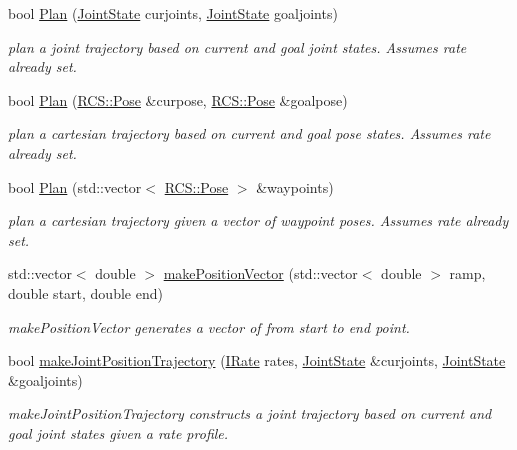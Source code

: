 \begin{DoxyCompactItemize}
bool \hyperlink{classTrajectoryMaker_aa107c5ae3573addb3bd93fa75814b4ab}{Plan} (\hyperlink{RCS_8h_aa4adb93a26caa4dacba9c9614e283245}{Joint\-State} curjoints, \hyperlink{RCS_8h_aa4adb93a26caa4dacba9c9614e283245}{Joint\-State} goaljoints)
\begin{DoxyCompactList}\small\item\em plan a joint trajectory based on current and goal joint states. Assumes rate already set. \end{DoxyCompactList}\item 
bool \hyperlink{classTrajectoryMaker_aee9a536ad21dbd5fb872a494bb65363c}{Plan} (\hyperlink{namespaceRCS_aa07e45d8a50e30064283d2b38087f999}{R\-C\-S\-::\-Pose} \&curpose, \hyperlink{namespaceRCS_aa07e45d8a50e30064283d2b38087f999}{R\-C\-S\-::\-Pose} \&goalpose)
\begin{DoxyCompactList}\small\item\em plan a cartesian trajectory based on current and goal pose states. Assumes rate already set. \end{DoxyCompactList}\item 
bool \hyperlink{classTrajectoryMaker_ad1b0030b7b7ae5ac1c17cbc9d70057c0}{Plan} (std\-::vector$<$ \hyperlink{namespaceRCS_aa07e45d8a50e30064283d2b38087f999}{R\-C\-S\-::\-Pose} $>$ \&waypoints)
\begin{DoxyCompactList}\small\item\em plan a cartesian trajectory given a vector of waypoint poses. Assumes rate already set. \end{DoxyCompactList}\item 
std\-::vector$<$ double $>$ \hyperlink{classTrajectoryMaker_aef3a8579c6f39bb357e41b9006229a2a}{make\-Position\-Vector} (std\-::vector$<$ double $>$ ramp, double start, double end)
\begin{DoxyCompactList}\small\item\em make\-Position\-Vector generates a vector of from start to end point. \end{DoxyCompactList}\item 
bool \hyperlink{classTrajectoryMaker_a6866c32dff71e077280ea82f6f8f9e16}{make\-Joint\-Position\-Trajectory} (\hyperlink{classRCS_1_1IRate}{I\-Rate} rates, \hyperlink{RCS_8h_aa4adb93a26caa4dacba9c9614e283245}{Joint\-State} \&curjoints, \hyperlink{RCS_8h_aa4adb93a26caa4dacba9c9614e283245}{Joint\-State} \&goaljoints)
\begin{DoxyCompactList}\small\item\em make\-Joint\-Position\-Trajectory constructs a joint trajectory based on current and goal joint states given a rate profile. \end{DoxyCompactList}\item 

\end{DoxyCompactItemize}
